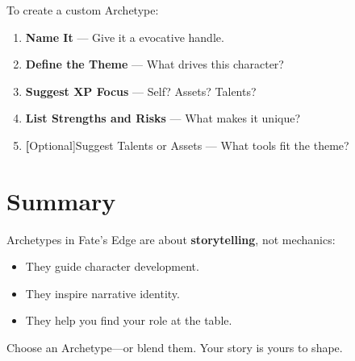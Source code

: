 To create a custom Archetype:

\begin{enumerate}
  \item \textbf{Name It} — Give it a evocative handle.
  \item \textbf{Define the Theme} — What drives this character?
  \item \textbf{Suggest XP Focus} — Self? Assets? Talents?
  \item \textbf{List Strengths and Risks} — What makes it unique?
  \item \textbf[Optional]{Suggest Talents or Assets} — What tools fit the theme?
\end{enumerate}

\section{Summary}

Archetypes in Fate’s Edge are about \textbf{storytelling}, not mechanics:

\begin{itemize}
  \item They guide character development.
  \item They inspire narrative identity.
  \item They help you find your role at the table.
\end{itemize}

Choose an Archetype—or blend them. Your story is yours to shape.

